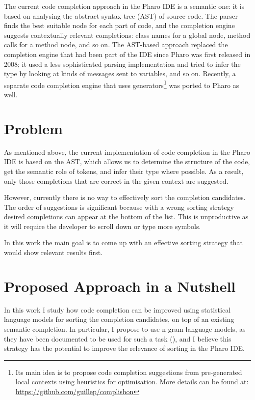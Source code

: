 The current code completion approach in the Pharo IDE is a semantic one: it is based on analysing the abstract syntax tree (AST) of source code. The parser finds the best suitable node for each part of code, and the completion engine suggests contextually relevant completions: class names for a global node, method calls for a method node, and so on. The AST-based approach replaced the completion engine that had been part of the IDE since Pharo was first released in 2008; it used a less sophisticated parsing implementation and tried to infer the type by looking at kinds of messages sent to variables, and so on. Recently, a separate code completion engine that uses generators\footnote{Its main idea is to propose code completion suggestions from pre-generated local contexts using heuristics for optimisation. More details can be found at: \url{https://github.com/guillep/complishon}} was ported to Pharo as well.

\section{Problem}
\label{sec:Introduction-Problem}
As mentioned above, the current implementation of code completion in the Pharo IDE is based on the AST, which allows us to determine the structure of the code, get the semantic role of tokens, and infer their type where possible. As a result, only those completions that are correct in the given context are suggested.

However, currently there is no way to effectively sort the completion candidates. The order of suggestions is significant because with a wrong sorting strategy desired completions can appear at the bottom of the list. This is unproductive as it will require the developer to scroll down or type more symbols. 

In this work the main goal is to come up with an effective sorting strategy that would show relevant results first. 

\section{Proposed Approach in a Nutshell}
\label{sec:Introduction-Approach}
In this work I study how code completion can be improved using statistical language models for sorting the completion candidates, on top of an existing semantic completion. In particular, I propose to use n-gram language models, as they have been documented to be used for such a task (\cite{Hind12a}), and I believe this strategy has the potential to improve the relevance of sorting in the Pharo IDE.

